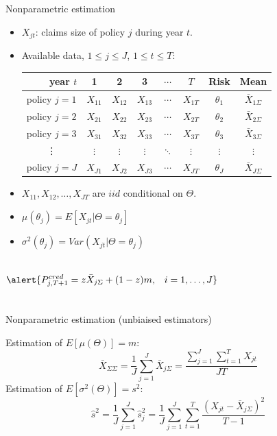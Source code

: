 \documentclass[11pt]{beamer}
\begin{document}
\begin{frame}{ Nonparametric estimation}

\begin{itemize}
\item $X_{jt}$: claims size of policy $j$ during year $t$.
\item Available data, $1\le j\le J$, $1\le t \le T$:
\begin{tabular}{l|ccccc|cc}
\multicolumn{1}{r}{year $t$} & 1 & 2 & 3 & $\cdots$ & $T$ & Risk & Mean \\ \hline
policy $j=1$ & $X_{11}$ & $X_{12}$ & $X_{13}$ & $\cdots$ & $X_{1T}$ & $\theta_1$ & $\bar{X}_{1\Sigma}$ \\
policy $j=2$ & $X_{21}$ & $X_{22}$ & $X_{23}$ & $\cdots$ & $X_{2T}$ & $\theta_2$ & $\bar{X}_{2\Sigma}$ \\
policy $j=3$ & $X_{31}$ & $X_{32}$ & $X_{33}$ & $\cdots$ & $X_{3T}$ & $\theta_3$ & $\bar{X}_{3\Sigma}$ \\
\multicolumn{1}{c|}{\vdots} & $\vdots$ & $\vdots$ & $\vdots$ & $\ddots$ & $\vdots$ & $\vdots$ & $\vdots$ \\
policy $j=J$ & $X_{J1}$ & $X_{J2}$ & $X_{J3}$ & $\cdots$ & $X_{JT}$ & $\theta_J$ & $\bar{X}_{J\Sigma}$
\end{tabular}
\item $X_{11},X_{12},\ldots,X_{JT}$ are $iid$ conditional on $\Theta$.
\item $\mu(\theta_j)=E[X_{jt}|\Theta=\theta_j]$
\item $\sigma^2(\theta_j)=Var(X_{jt}|\Theta=\theta_j)$
\end{itemize}
\begin{columns}
\begin{equation}\alert{P^{cred}_{j,T+1}=z \bar{X}_{j\Sigma} + (1-z)m,\;\;\;i=1,\ldots,J}\end{equation}
\end{columns}

\end{frame}
\begin{frame}{Nonparametric estimation (unbiaised estimators)}

Estimation of $E[\mu(\Theta)]=m$:
\begin{equation}\bar{X}_{\Sigma\Sigma}=\frac{1}{J}\sum_{j=1}^J \bar{X}_{j\Sigma}=\frac{\sum_{j=1}^J\sum_{t=1}^T X_{jt}}{JT}\end{equation}
Estimation of $E[\sigma^2(\Theta)]=s^2$:
\begin{equation}\hat{s}^2=\frac{1}{J}\sum_{j=1}^J\hat{s}_j^2=\frac{1}{J}\sum_{j=1}^J \sum_{t=1}^T \frac{(X_{jt}-\bar{X}_{j\Sigma})^2}{T-1}\end{equation}

\end{frame}
\end{document}
